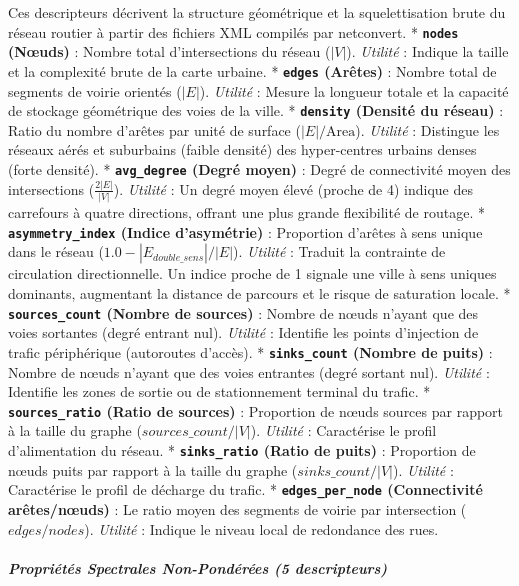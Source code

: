 \documentclass[10pt, a4paper]{article}
\begin{document}
Ces descripteurs décrivent la structure géométrique et la
squelettisation brute du réseau routier à partir des fichiers XML
compilés par netconvert. * \textbf{\texttt{nodes} (Nœuds)} : Nombre
total d'intersections du réseau (\(|V|\)). \emph{Utilité} : Indique la
taille et la complexité brute de la carte urbaine. *
\textbf{\texttt{edges} (Arêtes)} : Nombre total de segments de voirie
orientés (\(|E|\)). \emph{Utilité} : Mesure la longueur totale et la
capacité de stockage géométrique des voies de la ville. *
\textbf{\texttt{density} (Densité du réseau)} : Ratio du nombre d'arêtes
par unité de surface (\(|E|/\text{Area}\)). \emph{Utilité} : Distingue
les réseaux aérés et suburbains (faible densité) des hyper-centres
urbains denses (forte densité). * \textbf{\texttt{avg\_degree} (Degré
moyen)} : Degré de connectivité moyen des intersections
(\(\frac{2|E|}{|V|}\)). \emph{Utilité} : Un degré moyen élevé (proche de
4) indique des carrefours à quatre directions, offrant une plus grande
flexibilité de routage. * \textbf{\texttt{asymmetry\_index} (Indice
d'asymétrie)} : Proportion d'arêtes à sens unique dans le réseau
(\(1.0 - |E_{double\_sens}|/|E|\)). \emph{Utilité} : Traduit la
contrainte de circulation directionnelle. Un indice proche de 1 signale
une ville à sens uniques dominants, augmentant la distance de parcours
et le risque de saturation locale. * \textbf{\texttt{sources\_count}
(Nombre de sources)} : Nombre de nœuds n'ayant que des voies sortantes
(degré entrant nul). \emph{Utilité} : Identifie les points d'injection
de trafic périphérique (autoroutes d'accès). *
\textbf{\texttt{sinks\_count} (Nombre de puits)} : Nombre de nœuds
n'ayant que des voies entrantes (degré sortant nul). \emph{Utilité} :
Identifie les zones de sortie ou de stationnement terminal du trafic. *
\textbf{\texttt{sources\_ratio} (Ratio de sources)} : Proportion de
nœuds sources par rapport à la taille du graphe
(\(sources\_count/|V|\)). \emph{Utilité} : Caractérise le profil
d'alimentation du réseau. * \textbf{\texttt{sinks\_ratio} (Ratio de
puits)} : Proportion de nœuds puits par rapport à la taille du graphe
(\(sinks\_count/|V|\)). \emph{Utilité} : Caractérise le profil de
décharge du trafic. * \textbf{\texttt{edges\_per\_node} (Connectivité
arêtes/nœuds)} : Le ratio moyen des segments de voirie par intersection
(\(edges / nodes\)). \emph{Utilité} : Indique le niveau local de
redondance des rues.

\subparagraph{Propriétés Spectrales Non-Pondérées (5
descripteurs)}\label{propriuxe9tuxe9s-spectrales-non-ponduxe9ruxe9es-5-descripteurs}
\end{document}
